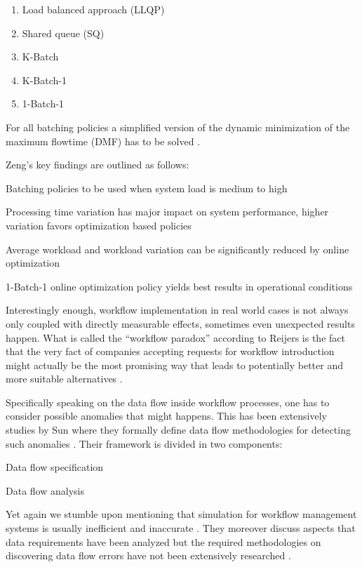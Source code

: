 \documentclass{seal_thesis}
\begin{document}
\begin{enumerate}
	\item Load balanced approach (LLQP)
	\item Shared queue (SQ)
	\item K-Batch
	\item K-Batch-1
	\item 1-Batch-1
\end{enumerate}

For all batching policies a simplified version of the dynamic minimization of the maximum flowtime (DMF) has to be solved \cite{Zeng2005}.

Zeng's key findings are outlined as follows:
\begin{enumerate*}
	\item Batching policies to be used when system load is medium to high
	\item Processing time variation has major impact on system performance, \ie higher variation favors optimization based policies
	\item Average workload and workload variation can be significantly reduced by online optimization
	\item 1-Batch-1 online optimization policy yields best results in operational conditions
\end{enumerate*}

Interestingly enough, workflow implementation in real world cases is not always only coupled with directly measurable effects, sometimes even unexpected results happen. What is called the ``workflow paradox'' according to Reijers is the fact that the very fact of companies accepting requests for workflow introduction might actually be the most promising way that leads to potentially better and more suitable alternatives \cite{Reijers2005}.

Specifically speaking on the data flow inside workflow processes, one has to consider possible anomalies that might happens. This has been extensively studies by Sun \etal where they formally define data flow methodologies for detecting such anomalies \cite{Sun2006}. Their framework is divided in two components:
\begin{enumerate*}
	\item Data flow specification
	\item Data flow analysis
\end{enumerate*}

Yet again we stumble upon mentioning that simulation for workflow management systems is usually inefficient and inaccurate \cite{Sun2006}. They moreover discuss aspects that data requirements have been analyzed but the required methodologies on discovering data flow errors have not been extensively researched \cite{Sun2006}.
\end{document}
